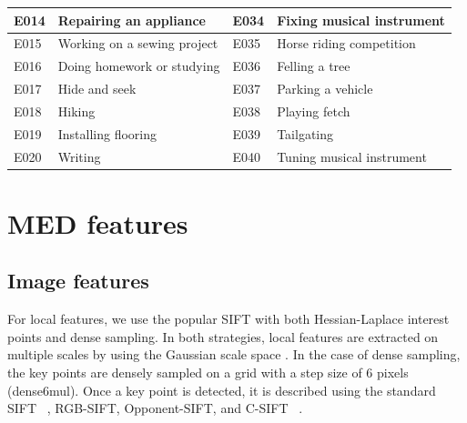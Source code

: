 \begin{table}
\begin{tabular}{@{}|c|l|l|l|@{}}
		\multicolumn{1}{|l|}{E014} & Repairing an appliance                   & E034        & Fixing musical instrument         \\ \midrule
		\multicolumn{1}{|l|}{E015} & Working on a sewing project              & E035        & Horse riding competition          \\ \midrule
		\multicolumn{1}{|l|}{E016} & Doing homework or studying               & E036        & Felling a tree                    \\ \midrule
		\multicolumn{1}{|l|}{E017} & Hide and seek                            & E037        & Parking a vehicle                 \\ \midrule
		\multicolumn{1}{|l|}{E018} & Hiking                                   & E038        & Playing fetch                     \\ \midrule
		\multicolumn{1}{|l|}{E019} & Installing flooring                      & E039        & Tailgating                        \\ \midrule
		\multicolumn{1}{|l|}{E020} & Writing                                  & E040        & Tuning musical instrument         \\ \bottomrule
	\end{tabular}
	\label{c2_eventlist}
\end{table}

\section{MED features}
\subsection{Image features}
For local features, we use the popular SIFT with both Hessian-Laplace interest points \cite{mikolajczyk2002affine} and dense sampling. In both strategies, local features are extracted on multiple scales by using the Gaussian scale space \cite{mikolajczyk2002affine}. In the case of dense sampling, the key points are densely sampled on a grid with a step size of 6 pixels (dense6mul). Once a key point is detected, it is described using the standard SIFT ~\cite{lowe2004distinctive}, RGB-SIFT, Opponent-SIFT, and C-SIFT ~\cite{burghouts2009performance}.

